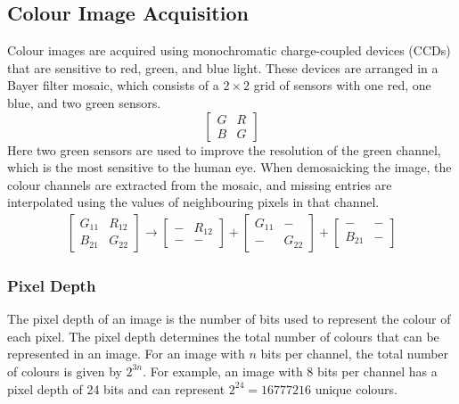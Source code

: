 \documentclass{article}
\begin{document}
\subsection{Colour Image Acquisition}
Colour images are acquired using monochromatic charge-coupled devices
(CCDs) that are sensitive to red, green, and blue light. These devices
are arranged in a Bayer filter mosaic, which consists of a \(2 \times
2\) grid of sensors with one red, one blue, and two green sensors.
\begin{equation*}
    \begin{bmatrix}
        G & R \\
        B & G
    \end{bmatrix}
\end{equation*}
Here two green sensors are used to improve the resolution of the green
channel, which is the most sensitive to the human eye. When demosaicking
the image, the colour channels are extracted from the mosaic, and
missing entries are interpolated using the values of neighbouring
pixels in that channel.
\begin{align*}
    \begin{bmatrix}
        G_{11} & R_{12} \\
        B_{21} & G_{22}
    \end{bmatrix}
    \to
    \begin{bmatrix}
        - & R_{12} \\
        - & -
    \end{bmatrix}
    +
    \begin{bmatrix}
        G_{11} & -      \\
        -      & G_{22}
    \end{bmatrix}
    +
    \begin{bmatrix}
        -      & - \\
        B_{21} & -
    \end{bmatrix}
\end{align*}
\subsubsection{Pixel Depth}
The pixel depth of an image is the number of bits used to represent the
colour of each pixel. The pixel depth determines the total number of
colours that can be represented in an image. For an image with \(n\)
bits per channel, the total number of colours is given by \(2^{3n}\).
For example, an image with 8 bits per channel has a pixel depth of 24
bits and can represent \(2^{24} = \num{16777216}\) unique colours.
\end{document}
